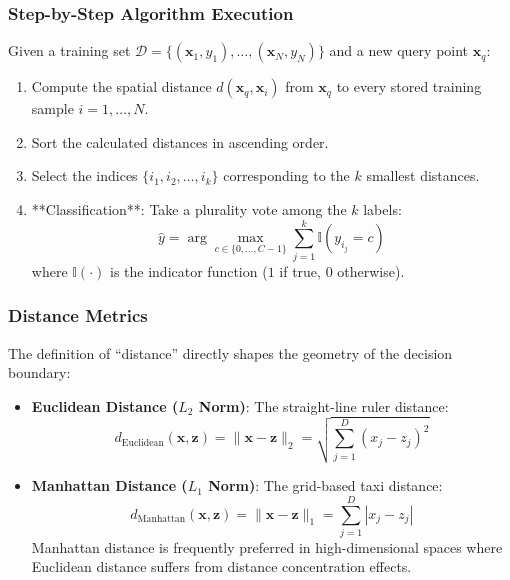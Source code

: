 \subsubsection{Step-by-Step Algorithm Execution}
Given a training set $\mathcal{D} = \{(\mathbf{x}_1, y_1), \dots, (\mathbf{x}_N, y_N)\}$ and a new query point $\mathbf{x}_q$:
\begin{enumerate}
    \item Compute the spatial distance $d(\mathbf{x}_q, \mathbf{x}_i)$ from $\mathbf{x}_q$ to every stored training sample $i = 1, \dots, N$.
    \item Sort the calculated distances in ascending order.
    \item Select the indices $\{i_1, i_2, \dots, i_k\}$ corresponding to the $k$ smallest distances.
    \item **Classification**: Take a plurality vote among the $k$ labels:
    \begin{equation}
    \hat{y} = \arg\max_{c \in \{0, \dots, C-1\}} \sum_{j=1}^{k} \mathbb{I}(y_{i_j} = c)\label{eq:knn_vote}
    \end{equation}
    where $\mathbb{I}(\cdot)$ is the indicator function ($1$ if true, $0$ otherwise).
\end{enumerate}

\subsubsection{Distance Metrics}
The definition of ``distance'' directly shapes the geometry of the decision boundary:
\begin{itemize}
    \item \textbf{Euclidean Distance ($L_2$ Norm)}: The straight-line ruler distance:
    \begin{equation}
    d_{\text{Euclidean}}(\mathbf{x}, \mathbf{z}) = \|\mathbf{x} - \mathbf{z}\|_2 = \sqrt{\sum_{j=1}^{D} (x_j - z_j)^2}\label{eq:euclidean_dist}
    \end{equation}
    \item \textbf{Manhattan Distance ($L_1$ Norm)}: The grid-based taxi distance:
    \begin{equation}
    d_{\text{Manhattan}}(\mathbf{x}, \mathbf{z}) = \|\mathbf{x} - \mathbf{z}\|_1 = \sum_{j=1}^{D} |x_j - z_j|\label{eq:manhattan_dist}
    \end{equation}
    Manhattan distance is frequently preferred in high-dimensional spaces where Euclidean distance suffers from distance concentration effects.
\end{itemize}

